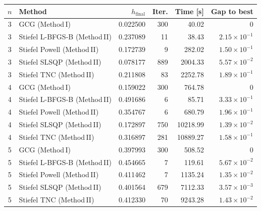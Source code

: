 \begin{tabular}{c l r r r r}
\toprule
$n$ & Method & $h_{\mathrm{final}}$ & Iter. & Time [s] & Gap to best \\
\midrule
3 & GCG (Method\,I) & 0.022500 & 300 & 40.02 & $0$ \\
3 & Stiefel L-BFGS-B (Method\,II) & 0.237089 & 11 & 38.43 & $2.15\times 10^{-1}$ \\
3 & Stiefel Powell (Method\,II) & 0.172739 & 9 & 282.02 & $1.50\times 10^{-1}$ \\
3 & Stiefel SLSQP (Method\,II) & 0.078177 & 889 & 2004.33 & $5.57\times 10^{-2}$ \\
3 & Stiefel TNC (Method\,II) & 0.211808 & 83 & 2252.78 & $1.89\times 10^{-1}$ \\
\midrule
4 & GCG (Method\,I) & 0.159022 & 300 & 764.78 & $0$ \\
4 & Stiefel L-BFGS-B (Method\,II) & 0.491686 & 6 & 85.71 & $3.33\times 10^{-1}$ \\
4 & Stiefel Powell (Method\,II) & 0.354767 & 6 & 680.79 & $1.96\times 10^{-1}$ \\
4 & Stiefel SLSQP (Method\,II) & 0.172897 & 750 & 10218.99 & $1.39\times 10^{-2}$ \\
4 & Stiefel TNC (Method\,II) & 0.316897 & 281 & 10889.27 & $1.58\times 10^{-1}$ \\
\midrule
5 & GCG (Method\,I) & 0.397993 & 300 & 508.52 & $0$ \\
5 & Stiefel L-BFGS-B (Method\,II) & 0.454665 & 7 & 119.61 & $5.67\times 10^{-2}$ \\
5 & Stiefel Powell (Method\,II) & 0.411462 & 7 & 1135.24 & $1.35\times 10^{-2}$ \\
5 & Stiefel SLSQP (Method\,II) & 0.401564 & 679 & 7112.33 & $3.57\times 10^{-3}$ \\
5 & Stiefel TNC (Method\,II) & 0.412330 & 70 & 9243.28 & $1.43\times 10^{-2}$ \\
\bottomrule
\end{tabular}